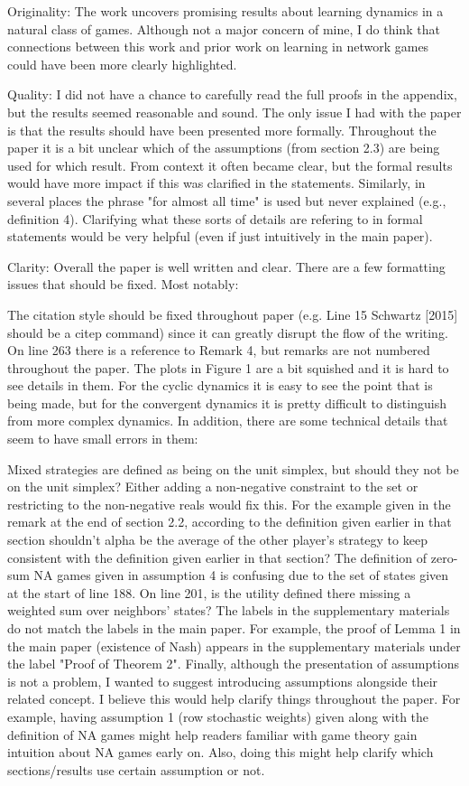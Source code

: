 \documentclass{article}
\begin{document}
	Originality: The work uncovers promising results about learning dynamics in a natural class of games. Although not a major concern of mine, I do think that connections between this work and prior work on learning in network games could have been more clearly highlighted.
	
	Quality: I did not have a chance to carefully read the full proofs in the appendix, but the results seemed reasonable and sound. The only issue I had with the paper is that the results should have been presented more formally. Throughout the paper it is a bit unclear which of the assumptions (from section 2.3) are being used for which result. From context it often became clear, but the formal results would have more impact if this was clarified in the statements. Similarly, in several places the phrase "for almost all time" is used but never explained (e.g., definition 4). Clarifying what these sorts of details are refering to in formal statements would be very helpful (even if just intuitively in the main paper).
	
	Clarity: Overall the paper is well written and clear. There are a few formatting issues that should be fixed. Most notably:
	
	The citation style should be fixed throughout paper (e.g. Line 15 Schwartz [2015] should be a citep command) since it can greatly disrupt the flow of the writing.
	On line 263 there is a reference to Remark 4, but remarks are not numbered throughout the paper.
	The plots in Figure 1 are a bit squished and it is hard to see details in them. For the cyclic dynamics it is easy to see the point that is being made, but for the convergent dynamics it is pretty difficult to distinguish from more complex dynamics.
	In addition, there are some technical details that seem to have small errors in them:
	
	Mixed strategies are defined as being on the unit simplex, but should they not be on the unit simplex? Either adding a non-negative constraint to the set or restricting to the non-negative reals would fix this.
	For the example given in the remark at the end of section 2.2, according to the definition given earlier in that section shouldn't alpha be the average of the other player's strategy to keep consistent with the definition given earlier in that section?
	The definition of zero-sum NA games given in assumption 4 is confusing due to the set of states given at the start of line 188.
	On line 201, is the utility defined there missing a weighted sum over neighbors' states?
	The labels in the supplementary materials do not match the labels in the main paper. For example, the proof of Lemma 1 in the main paper (existence of Nash) appears in the supplementary materials under the label "Proof of Theorem 2".
	Finally, although the presentation of assumptions is not a problem, I wanted to suggest introducing assumptions alongside their related concept. I believe this would help clarify things throughout the paper. For example, having assumption 1 (row stochastic weights) given along with the definition of NA games might help readers familiar with game theory gain intuition about NA games early on. Also, doing this might help clarify which sections/results use certain assumption or not.
	
\end{document}
